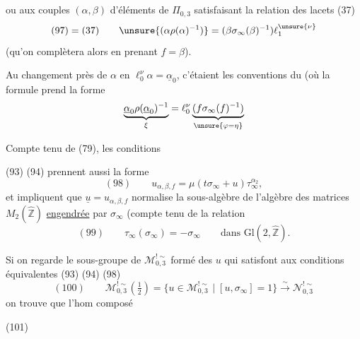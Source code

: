 
ou aux couples $(\alpha,\beta)$ d'éléments de $\widehat{\Pi}_{0,3}$
satisfaisant la relation des lacets (37)
\[
 (97)=(37)\qquad
 \unsure{(\alpha\rho(\alpha)^{-1})}
 =(\beta\sigma_\infty(\beta)^{-1})\ell_1^{\unsure{\nu}}
\]
(qu'on complètera alors en prenant $f=\beta$).


Au changement près de $\alpha$ en $\ell_0^\nu\alpha=\underline{\alpha}_0$,
c'étaient les conventions du  (où la formule prend
 la forme
\[
 \underbrace{\underline{\alpha}_0\rho(\underline{\alpha}_0)^{-1}}_{\xi}
 =\ell_0^\nu
 \underbrace{(f\sigma_\infty(f)^{-1})}_{\unsure{\varphi=\eta}}
\]

Compte tenu de (79), les conditions


(93) (94) prennent aussi la forme
\[
 (98)\qquad u_{\alpha,\beta,f}
 =\mu(t\sigma_\infty+u)\tau_\infty^{\alpha_2},
\]
et impliquent que $\underline{u}=u_{\alpha,\beta,f}$
 normalise la sous-algèbre de l'algèbre des matrices
$M_2(\widehat{\mathbb Z})$ \uline{engendrée} par $\sigma_\infty$
(compte tenu de la relation
\[
 (99)\qquad \tau_\infty(\sigma_\infty)=-\sigma_\infty
 \qquad\text{dans }\mathrm{Gl}(2,\widehat{\mathbb Z}).
\]

Si on regarde le sous-groupe de $\mathcal M_{0,3}^{!\sim}$
formé des $u$ qui satisfont aux conditions équivalentes (93) (94) (98)
\[
 (100)\qquad
 \mathcal M_{0,3}^{!\sim}\left(\tfrac12\right)
 =
 \{u\in\mathcal M_{0,3}^{!\sim}\mid [u,\sigma_\infty]=1\}
 \overset{\sim}{\longrightarrow}\mathcal N_{0,3}^{!\sim}
\]
on trouve que l'hom composé


(101)

